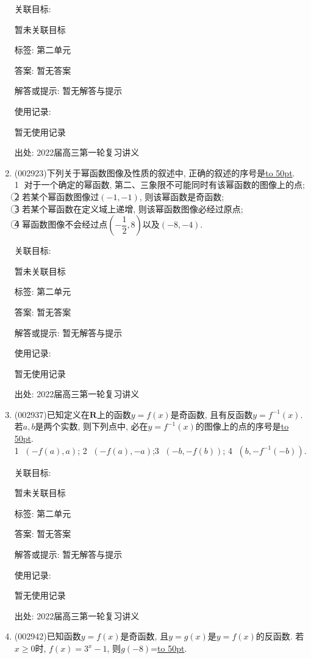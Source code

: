 \documentclass[10pt,a4paper]{article}
\newcommand{\blank}[1]{\underline{\hbox to #1pt{}}}
\begin{document}
\begin{enumerate}[1.]
关联目标:

暂未关联目标



标签: 第二单元

答案: 暂无答案

解答或提示: 暂无解答与提示

使用记录:

暂无使用记录


出处: 2022届高三第一轮复习讲义
\item { (002923)}下列关于幂函数图像及性质的叙述中, 正确的叙述的序号是\blank{50}.\\
\textcircled{1} 对于一个确定的幂函数, 第二、三象限不可能同时有该幂函数的图像上的点;\\
\textcircled{2} 若某个幂函数图像过$(-1,-1)$, 则该幂函数是奇函数;\\
\textcircled{3} 若某个幂函数在定义域上递增, 则该幂函数图像必经过原点;\\
\textcircled{4} 幂函数图像不会经过点$(-\dfrac 12,8)$以及$(-8,-4)$.


关联目标:

暂未关联目标



标签: 第二单元

答案: 暂无答案

解答或提示: 暂无解答与提示

使用记录:

暂无使用记录


出处: 2022届高三第一轮复习讲义
\item { (002937)}已知定义在$\mathbf{R}$上的函数$y=f(x)$是奇函数, 且有反函数$y=f^{-1}(x)$. 若$a,b$是两个实数, 则下列点中, 必在$y=f^{-1}(x)$的图像上的点的序号是\blank{50}.\\
\textcircled{1} $(-f(a),a)$; \textcircled{2} $(-f(a),-a)$;\textcircled{3} $(-b,-f(b))$; \textcircled{4} $(b,-f^{-1}(-b))$.


关联目标:

暂未关联目标



标签: 第二单元

答案: 暂无答案

解答或提示: 暂无解答与提示

使用记录:

暂无使用记录


出处: 2022届高三第一轮复习讲义
\item { (002942)}已知函数$y=f(x)$是奇函数, 且$y=g(x)$是$y=f(x)$的反函数. 若$x\ge 0$时, $f(x)=3^x-1$, 则$g(-8)$=\blank{50}.



\end{enumerate}
\end{document}
